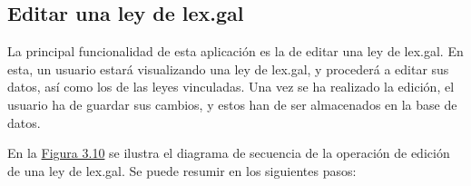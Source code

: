 \subsection{Editar una ley de lex.gal}

La principal funcionalidad de esta aplicación es la de editar una ley de lex.gal. En esta, un usuario estará visualizando una ley de lex.gal, y procederá a editar sus datos, así como los de las leyes vinculadas. Una vez se ha realizado la edición, el usuario ha de guardar sus cambios, y estos han de ser almacenados en la base de datos.



En la \hyperref[enlaceDRegistro]{Figura 3.10} se ilustra el diagrama de secuencia de la operación de edición de una ley de lex.gal. Se puede resumir en los siguientes pasos:

